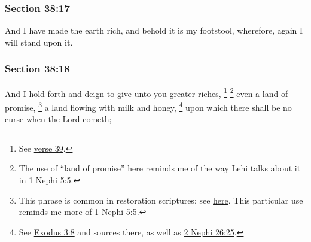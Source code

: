 
	\subsubsection{Section 38:17} %
		\label{DC38-17}

		And I have made the earth rich, and behold it is my footstool, wherefore, again I will stand upon it.


	\subsubsection{Section 38:18} %
		\label{DC38-18}

		And I hold forth and deign to give unto you greater riches,%
			\footnote{%
				See \hyperref[DC38-39]{verse 39}.
				}
			\footnote{%
				The use of ``land of promise'' here reminds me of the way Lehi talks about it in \hyperref[1NEPHI-5-5]{1 Nephi 5:5}.
				}%
		even a land of promise,%
			\footnote{%
				This phrase is common in restoration scriptures; see \hyperref[PROMISE-PHRASES]{here}. This particular use reminds me more of \hyperref[1NEPHI-5-5]{1 Nephi 5:5}.
				}
		a land flowing with milk and honey,%
			\footnote{%
				See \hyperref[EXODUS-3-8]{Exodus 3:8} and sources there, as well as \hyperref[2NEPHI-26-25]{2 Nephi 26:25}.
				}
		upon which there shall be no curse when the Lord cometh;


